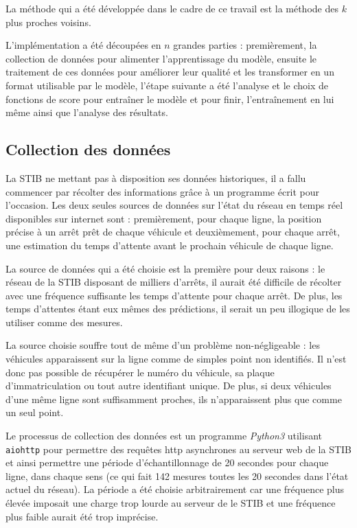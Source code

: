 \documentclass[letterpaper]{article}
\begin{document}
La méthode qui a été développée dans le cadre de ce travail est la méthode des $k$ plus proches voisins.


L'implémentation a été découpées en $n$ grandes parties : premièrement, la collection de données pour alimenter l'apprentissage du modèle, ensuite le traitement de ces données pour améliorer leur qualité et les transformer en un format utilisable par le modèle, l'étape suivante a été l'analyse et le choix de fonctions de score pour entraîner le modèle et pour finir, l’entraînement en lui même ainsi que l'analyse des résultats.

\subsection{Collection des données}

La STIB ne mettant pas à disposition ses données historiques, il a fallu commencer par récolter des informations grâce à un programme écrit pour l'occasion. Les deux seules sources de données sur l'état du réseau en temps réel disponibles sur internet sont : premièrement, pour chaque ligne, la position précise à un arrêt prêt de chaque véhicule et deuxièmement, pour chaque arrêt, une estimation du temps d'attente avant le prochain véhicule de chaque ligne.

La source de données qui a été choisie est la première pour deux raisons : le réseau de la STIB disposant de milliers d'arrêts, il aurait été difficile de récolter avec une fréquence suffisante les temps d'attente pour chaque arrêt. De plus, les temps d'attentes étant eux mêmes des prédictions, il serait un peu illogique de les utiliser comme des mesures.

La source choisie souffre tout de même d'un problème non-négligeable : les véhicules apparaissent sur la ligne comme de simples point non identifiés. Il n'est donc pas possible de récupérer le numéro du véhicule, sa plaque d'immatriculation ou tout autre identifiant unique. De plus, si deux véhicules d'une même ligne sont suffisamment proches, ils n'apparaissent plus que comme un seul point.

Le processus de collection des données est un programme \textit{Python3} utilisant \texttt{aiohttp} pour permettre des requêtes http asynchrones au serveur web de la STIB et ainsi permettre une période d’échantillonnage de 20 secondes pour chaque ligne, dans chaque sens (ce qui fait 142 mesures toutes les 20 secondes dans l'état actuel du réseau). La période a été choisie arbitrairement car une fréquence plus élevée imposait une charge trop lourde au serveur de le STIB et une fréquence plus faible aurait été trop imprécise.
\end{document}
